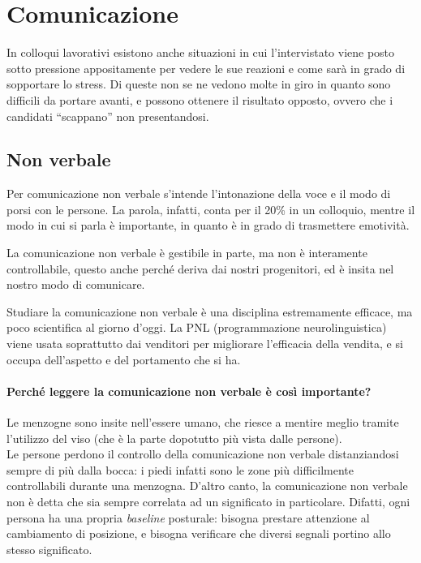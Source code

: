\section{Comunicazione}
In colloqui lavorativi esistono anche situazioni in cui l'intervistato viene
posto sotto pressione appositamente per vedere le sue reazioni e come sarà in
grado di sopportare lo stress. Di queste non se ne vedono molte in giro in
quanto sono difficili da portare avanti, e possono ottenere il risultato
opposto, ovvero che i candidati ``scappano'' non presentandosi.

\subsection{Non verbale}

Per comunicazione non verbale s'intende l'intonazione della voce e il modo di
porsi con le persone. La parola, infatti, conta per il 20\% in un colloquio,
mentre il modo in cui si parla è importante, in quanto è in grado di
trasmettere emotività.

La comunicazione non verbale è gestibile in parte, ma non è interamente
controllabile, questo anche perché deriva dai nostri progenitori, ed è insita
nel nostro modo di comunicare.

Studiare la comunicazione non verbale è una disciplina estremamente efficace,
ma poco scientifica al giorno d'oggi. La PNL (programmazione neurolinguistica)
viene usata soprattutto dai venditori per migliorare l'efficacia della vendita,
e si occupa dell'aspetto e del portamento che si ha.

\paragraph*{Perché leggere la comunicazione non verbale è così importante?} Le
menzogne sono insite nell'essere umano, che riesce a mentire meglio tramite
l'utilizzo del viso (che è la parte dopotutto più vista dalle
persone).\\[0.3cm]

\noindent Le persone perdono il controllo della comunicazione non verbale
distanziandosi sempre di più dalla bocca: i piedi infatti sono le zone più
difficilmente controllabili durante una menzogna. D'altro canto, la
comunicazione non verbale non è detta che sia sempre correlata ad un significato
in particolare. Difatti, ogni persona ha una propria \textit{baseline}
posturale: bisogna prestare attenzione al cambiamento di posizione, e bisogna
verificare che diversi segnali portino allo stesso significato.

